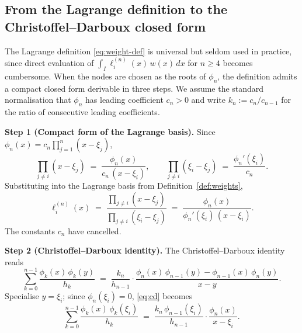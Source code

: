 \documentclass[11pt,a4paper]{article}
\theoremstyle{definition}
\begin{document}
\subsection{From the Lagrange definition to the Christoffel--Darboux closed
form}\label{sec:CD-derivation}

The Lagrange definition \eqref{eq:weight-def} is universal but seldom used in
practice, since direct evaluation of $\int_I \ell_i^{(n)}(x)\,w(x)\,dx$ for
$n\ge 4$ becomes cumbersome. When the nodes are chosen as the roots of
$\phi_n$, the definition admits a compact closed form derivable in three steps.
We assume the standard normalisation that $\phi_n$ has leading coefficient
$c_n>0$ and write $k_n:=c_n/c_{n-1}$ for the ratio of consecutive leading
coefficients.

\textbf{Step 1 (Compact form of the Lagrange basis).}
Since $\phi_n(x)=c_n\prod_{j=1}^n(x-\xi_j)$,
\[
  \prod_{j\neq i}(x-\xi_j) \;=\; \frac{\phi_n(x)}{c_n\,(x-\xi_i)},
  \qquad
  \prod_{j\neq i}(\xi_i-\xi_j) \;=\; \frac{\phi_n'(\xi_i)}{c_n}.
\]
Substituting into the Lagrange basis from Definition~\ref{def:weights},
\begin{equation}
  \ell_i^{(n)}(x) \;=\;
  \frac{\prod_{j\neq i}(x-\xi_j)}{\prod_{j\neq i}(\xi_i-\xi_j)}
  \;=\;
  \frac{\phi_n(x)}{\phi_n'(\xi_i)\,(x-\xi_i)}.
  \label{eq:lagrange-compact}
\end{equation}
The constants $c_n$ have cancelled.

\textbf{Step 2 (Christoffel--Darboux identity).}
The Christoffel--Darboux identity \cite[Thm.~3.2.2]{Szego1975} reads
\begin{equation}
  \sum_{k=0}^{n-1}\frac{\phi_k(x)\,\phi_k(y)}{h_k}
  \;=\;\frac{k_n}{h_{n-1}}\cdot
  \frac{\phi_n(x)\,\phi_{n-1}(y)-\phi_{n-1}(x)\,\phi_n(y)}{x-y}.
  \label{eq:cd}
\end{equation}
Specialise $y=\xi_i$; since $\phi_n(\xi_i)=0$, \eqref{eq:cd} becomes
\begin{equation}
  \sum_{k=0}^{n-1}\frac{\phi_k(x)\,\phi_k(\xi_i)}{h_k}
  \;=\;\frac{k_n\,\phi_{n-1}(\xi_i)}{h_{n-1}}\cdot\frac{\phi_n(x)}{x-\xi_i}.
  \label{eq:cd-spec}
\end{equation}
\end{document}
